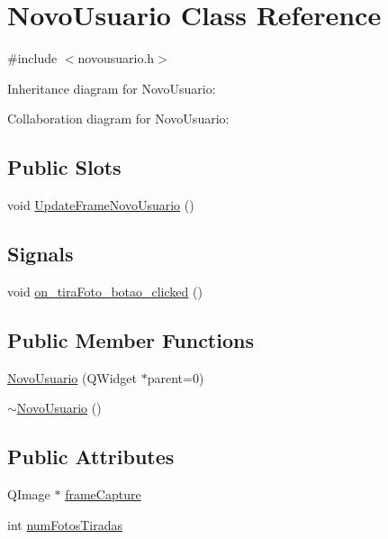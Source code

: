 \hypertarget{classNovoUsuario}{}\section{Novo\+Usuario Class Reference}
\label{classNovoUsuario}


{\ttfamily \#include $<$novousuario.\+h$>$}



Inheritance diagram for Novo\+Usuario\+:


Collaboration diagram for Novo\+Usuario\+:
\subsection*{Public Slots}
\begin{DoxyCompactItemize}
\item 
void \hyperlink{classNovoUsuario_a023fce202af8022f8fd4a524b86ac3ff}{Update\+Frame\+Novo\+Usuario} ()
\end{DoxyCompactItemize}
\subsection*{Signals}
\begin{DoxyCompactItemize}
\item 
void \hyperlink{classNovoUsuario_af0e0ed778c6655dffcc5507e780610c1}{on\+\_\+tira\+Foto\+\_\+botao\+\_\+clicked} ()
\end{DoxyCompactItemize}
\subsection*{Public Member Functions}
\begin{DoxyCompactItemize}
\item 
\hyperlink{classNovoUsuario_ac8ded8695960d2308b9fe1ae8919a8e3}{Novo\+Usuario} (Q\+Widget $\ast$parent=0)
\item 
\hyperlink{classNovoUsuario_ab1670c4c5cf10f2ff42af84faddbbe16}{$\sim$\+Novo\+Usuario} ()
\end{DoxyCompactItemize}
\subsection*{Public Attributes}
\begin{DoxyCompactItemize}
\item 
Q\+Image $\ast$ \hyperlink{classNovoUsuario_aa235edcc12dedb18b600c5ad23972d6c}{frame\+Capture}
\item 
int \hyperlink{classNovoUsuario_ad40ab4a4114606baee0f8ba9ea634070}{num\+Fotos\+Tiradas}
\end{DoxyCompactItemize}


